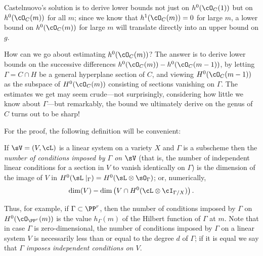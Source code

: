 Castelnuovo's solution  is to derive lower bounds not just on $h^0(\cO_C(1))$ but on $h^0(\cO_C(m))$ for all $m$; since we know that $h^1(\cO_C(m)) = 0$ for large $m$, a lower bound on $h^0(\cO_C(m))$ for large $m$ will translate directly into an upper bound on $g$.

How can we go about estimating $h^0(\cO_C(m))$? The answer is to derive lower bounds on the successive differences $h^0(\cO_C(m)) - h^0(\cO_C(m-1))$, by letting $\Gamma = C \cap H$ be a general hyperplane section of $C$, and viewing $H^0(\cO_C(m-1))$ as the subspace of $H^0(\cO_C(m))$ consisting of sections vanishing on $\Gamma$. The estimates we get may seem crude---not surprisingly, considering how little we know about $\Gamma$---but remarkably, the bound we ultimately derive on the genus of $C$ turns out to be sharp!

For the proof, the following definition will be convenient:

\begin{definition}
If $\sV = (V,\cL)$ is a linear system on a variety $X$ and $\Gamma$ is a subscheme then the \emph{number of conditions imposed by $\Gamma$ on $\sV$} (that is, the number of independent linear conditions for a section in $V$ to vanish
identically on $\Gamma$) is the dimension of the image of $V$ in $H^0(\sL\mid_\Gamma) = H^0(\sL \otimes \sO_\Gamma)$; or, numerically,
$$
\dim(V) - \dim \left(V \cap H^0(\cL\otimes \cI_{\Gamma/X}) \right).
$$
\end{definition}

Thus, for example, if $\Gamma \subset \PP^r$, then the number of conditions imposed by $\Gamma$ on $H^0(\cO_{\PP^r}(m))$ is the value $h_\Gamma(m)$ of the Hilbert function of $\Gamma$ at $m$.
Note that in case $\Gamma$ is zero-dimensional, the number of conditions imposed by $\Gamma$ on a linear system $V$ is necessarily less than or equal to the degree $d$ of $\Gamma$; if it is equal we say that $\Gamma$ \emph{imposes independent conditions on $V$}.

